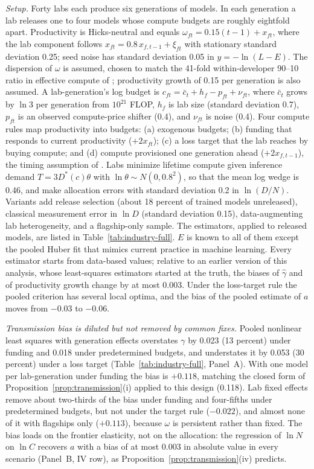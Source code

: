 \documentclass[AER,finalmode]{AEA}
\theoremstyle{definition}
\theoremstyle{remark}
\begin{document}
\textit{Setup.} Forty labs each produce six generations of models. In each generation a lab releases one to four
models whose compute budgets are roughly eightfold apart. Productivity is Hicks-neutral and equals
$\omega_{ft}=0.15(t-1)+x_{ft}$, where the lab component follows $x_{ft}=0.8\,x_{f,t-1}+\xi_{ft}$ with stationary
standard deviation 0.25; seed noise has standard deviation 0.05 in $y=-\ln(L-E)$. The dispersion of $\omega$ is
assumed, chosen to match the 41-fold within-developer 90--10 ratio in effective compute of
\citet{mertens2026secret}; productivity growth of 0.15 per generation is also assumed. A lab-generation's log budget is
$c_{ft}=\bar c_t+h_f-p_{ft}+\nu_{ft}$, where $\bar c_t$ grows by $\ln3$ per generation from $10^{21}$ FLOP, $h_f$ is
lab size (standard deviation 0.7), $p_{ft}$ is an observed compute-price shifter (0.4), and $\nu_{ft}$ is noise
(0.4). Four compute rules map productivity into budgets: (a) exogenous budgets; (b) funding that responds to
current productivity ($+2x_{ft}$); (c) a loss target that the lab reaches by buying compute; and (d) compute
provisioned one generation ahead ($+2x_{f,t-1}$), the timing assumption of \citet{ackerberg2015identification}. Labs
minimize lifetime compute given inference demand $T=3D^*(c)\theta$ with $\ln\theta\sim N(0,0.8^2)$, so that the mean
log wedge is 0.46, and make allocation errors with standard deviation 0.2 in $\ln(D/N)$. Variants add release
selection (about 18 percent of trained models unreleased), classical measurement error in $\ln D$ (standard
deviation 0.15), data-augmenting lab heterogeneity, and a flagship-only sample. The estimators, applied to released
models, are listed in Table~\ref{tab:industry-full}. $E$ is known to all of them except the pooled Huber fit that
mimics current practice in machine learning. Every estimator starts from data-based values; relative to an earlier
version of this analysis, whose least-squares estimators started at the truth, the biases of $\hat\gamma$ and of
productivity growth change by at most 0.003. Under the loss-target rule the pooled criterion has several local optima,
and the bias of the pooled estimate of $a$ moves from $-0.03$ to $-0.06$.

\textit{Transmission bias is diluted but not removed by common fixes.} Pooled nonlinear least squares with generation
effects overstates $\gamma$ by 0.023 (13 percent) under funding and 0.018 under predetermined budgets, and understates
it by 0.053 (30 percent) under a loss target (Table~\ref{tab:industry-full}, Panel~A). With one model per
lab-generation under funding the bias is $+0.118$, matching the closed form of Proposition~\ref{prop:transmission}(i)
applied to this design (0.118). Lab fixed effects remove about two-thirds of the bias under funding and four-fifths
under predetermined budgets, but not under the target rule ($-0.022$), and almost none of it with flagships only
($+0.113$), because $\omega$ is persistent rather than fixed. The bias loads on the frontier elasticity, not on the
allocation: the regression of $\ln N$ on $\ln C$ recovers $a$ with a bias of at most 0.003 in absolute value in every
scenario (Panel~B, IV row), as Proposition~\ref{prop:transmission}(iv) predicts.
\end{document}
